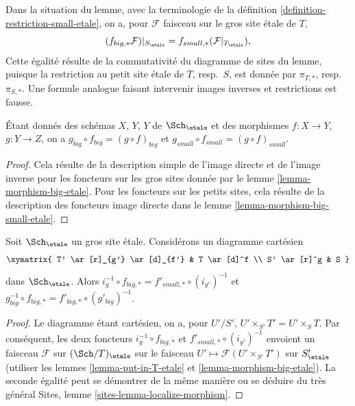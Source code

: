 \noindent
Dans la situation du lemme, avec la terminologie de la
définition \ref{definition-restriction-small-etale},
on a, pour $\mathcal{F}$ faisceau sur le gros site étale de $T$,
$$
(f_{big, *}\mathcal{F})|_{S_\etale} =
f_{small, *}(\mathcal{F}|_{T_\etale}),
$$
Cette égalité résulte de la commutativité du diagramme de
sites du lemme, puisque la restriction au petit site étale de
$T$, resp.\ $S$, est donnée par $\pi_{T, *}$, resp.\ $\pi_{S, *}$. Une formule
analogue faisant intervenir images inverses et restrictions est fausse.

\begin{lemma}
\label{lemma-composition-etale}
Étant donnés des schémas $X$, $Y$, $Y$ de $\Sch_\etale$
et des morphismes $f : X \to Y$, $g : Y \to Z$, on a
$g_{big} \circ f_{big} = (g \circ f)_{big}$ et
$g_{small} \circ f_{small} = (g \circ f)_{small}$.
\end{lemma}

\begin{proof}
Cela résulte de la description simple de l'image directe
et de l'image inverse pour les foncteurs sur les gros sites donnée par le
lemme \ref{lemma-morphism-big-etale}. Pour les foncteurs
sur les petits sites, cela résulte de la description des
foncteurs image directe dans le lemme \ref{lemma-morphism-big-small-etale}.
\end{proof}

\begin{lemma}
\label{lemma-morphism-big-small-cartesian-diagram-etale}
Soit $\Sch_\etale$ un gros site étale. Considérons un diagramme cartésien
$$
\xymatrix{
T' \ar[r]_{g'} \ar[d]_{f'} & T \ar[d]^f \\
S' \ar[r]^g & S
}
$$
dans $\Sch_\etale$. Alors
$i_g^{-1} \circ f_{big, *} = f'_{small, *} \circ (i_{g'})^{-1}$
et $g_{big}^{-1} \circ f_{big, *} = f'_{big, *} \circ (g'_{big})^{-1}$.
\end{lemma}

\begin{proof}
Le diagramme étant cartésien, on a, pour $U'/S'$,
$U' \times_{S'} T' = U' \times_S T$. Par conséquent, les deux foncteurs
$i_g^{-1} \circ f_{big, *}$ et $f'_{small, *} \circ (i_{g'})^{-1}$
envoient un faisceau $\mathcal{F}$ sur $(\Sch/T)_\etale$ sur le faisceau
$U' \mapsto \mathcal{F}(U' \times_{S'} T')$ sur $S'_\etale$
(utiliser les lemmes \ref{lemma-put-in-T-etale} et \ref{lemma-morphism-big-etale}).
La seconde égalité peut se démontrer de la même manière ou se
déduire du très général
Sites, lemme \ref{sites-lemma-localize-morphism}.
\end{proof}

